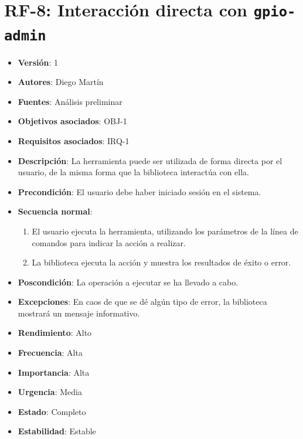 \documentclass[letterpaper,10pt,spanish]{sphinxmanual}
\begin{document}
\section{RF-8: Interacción directa con \texttt{gpio-admin}}
\label{analysis/fr:rf-8-interaccion-directa-con-gpio-admin}\begin{itemize}
\item {} 
\textbf{Versión}: 1

\item {} 
\textbf{Autores}: Diego Martín

\item {} 
\textbf{Fuentes}: Análisis preliminar

\item {} 
\textbf{Objetivos asociados}: OBJ-1

\item {} 
\textbf{Requisitos asociados}: IRQ-1

\item {} 
\textbf{Descripción}: La herramienta  puede ser utilizada de forma directa por el usuario, de la misma forma que la biblioteca interactúa con ella.

\item {} 
\textbf{Precondición}: El usuario debe haber iniciado sesión en el sistema.

\item {} 
\textbf{Secuencia normal}:
\begin{enumerate}
\item {} 
El usuario ejecuta la herramienta, utilizando los parámetros de la línea de comandos para indicar la acción a realizar.

\item {} 
La biblioteca ejecuta la acción y muestra los resultados de éxito o error.

\end{enumerate}

\item {} 
\textbf{Poscondición}: La operación a ejecutar se ha llevado a cabo.

\item {} 
\textbf{Excepciones}: En caos de que se dé algún tipo de error, la biblioteca mostrará un mensaje informativo.

\item {} 
\textbf{Rendimiento}: Alto

\item {} 
\textbf{Frecuencia}: Alta

\item {} 
\textbf{Importancia}: Alta

\item {} 
\textbf{Urgencia}: Media

\item {} 
\textbf{Estado}: Completo

\item {} 
\textbf{Estabilidad}: Estable

\end{itemize}
\end{document}
